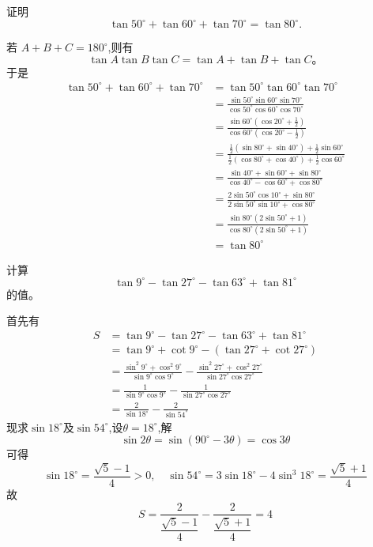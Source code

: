 \begin{questions}
    \question 证明 
    \[
    \tan 50^\circ + \tan 60^\circ + \tan 70^\circ = \tan 80^\circ.
    \]
    \begin{solution}
        若 $A+B+C=180^\circ$,则有
        \[
        \tan A \tan B \tan C = \tan A + \tan B + \tan C。
        \]
        于是
        \begin{align*}
        \tan 50^\circ + \tan 60^\circ + \tan 70^\circ
        &= \tan 50^\circ \tan 60^\circ \tan 70^\circ \\[1pt]
        &= \frac{\sin 50^\circ \sin 60^\circ \sin 70^\circ}{\cos 50^\circ \cos 60^\circ \cos 70^\circ} \\[2pt]
        &= \frac{\sin 60^\circ \left(\cos 20^\circ + \frac{1}{2}\right)}{\cos 60^\circ \left(\cos 20^\circ - \frac{1}{2}\right)} \\[2pt]
        &= \frac{\frac{1}{2}(\sin 80^\circ + \sin 40^\circ) + \frac{1}{2}\sin 60^\circ}{\frac{1}{2}(\cos 80^\circ + \cos 40^\circ) + \frac{1}{2}\cos 60^\circ} \\[2pt]
        &= \frac{\sin 40^\circ + \sin 60^\circ + \sin 80^\circ}{\cos 40^\circ - \cos 60^\circ + \cos 80^\circ} \\[2pt]
        &= \frac{2 \sin 50^\circ \cos 10^\circ + \sin 80^\circ}{2 \sin 50^\circ \sin 10^\circ + \cos 80^\circ} \\[2pt]
        &= \frac{\sin 80^\circ (2 \sin 50^\circ + 1)}{\cos 80^\circ (2 \sin 50^\circ + 1)} \\[2pt]
        &= \tan 80^\circ
        \end{align*}
    \end{solution}

    \question 计算 
    \[
    \tan 9^\circ - \tan 27^\circ - \tan 63^\circ + \tan 81^\circ
    \]
    的值。
    \begin{solution}
        首先有
        \begin{align*}
        S &=\tan 9^\circ - \tan 27^\circ - \tan 63^\circ + \tan 81^\circ \\
        &= \tan 9^\circ + \cot 9^\circ - (\tan 27^\circ + \cot 27^\circ) \\[1pt]
        &= \frac{\sin^2 9^\circ + \cos^2 9^\circ}{\sin 9^\circ \cos 9^\circ}
        - \frac{\sin^2 27^\circ + \cos^2 27^\circ}{\sin 27^\circ \cos 27^\circ} \\[2pt]
        &= \frac{1}{\sin 9^\circ \cos 9^\circ} - \frac{1}{\sin 27^\circ \cos 27^\circ} \\[2pt]
        &= \frac{2}{\sin 18^\circ} - \frac{2}{\sin 54^\circ}
        \end{align*}
        现求$\sin 18^\circ$及$\sin 54^\circ$,设$\theta=18^\circ$,解
        \[
        \sin 2\theta = \sin (90^\circ-3\theta)=\cos 3\theta
        \]
        可得
        \[
        \sin 18^\circ=\frac{\sqrt{5}-1}{4}>0,\quad \sin 54^\circ = 3\sin 18^\circ-4\sin^3 18^\circ = \frac{\sqrt{5}+1}{4}
        \]
        故
        \[
        S = \frac{2}{\dfrac{\sqrt{5}-1}{4}} - \frac{2}{\dfrac{\sqrt{5}+1}{4}}= 4
        \]
    \end{solution}


\end{questions}
